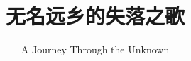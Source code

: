 \documentclass{novel}
\title     {无名远乡的失落之歌}
\subtitle  {A Journey Through the Unknown}
\begin{document}
\frontmatter


\toc

\mainmatter


\end{document}

